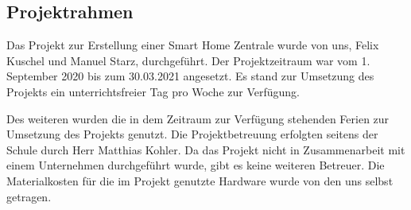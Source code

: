 \subsection{Projektrahmen}
Das Projekt zur Erstellung einer Smart Home Zentrale wurde von uns, Felix Kuschel und Manuel Starz, durchgeführt. Der Projektzeitraum war vom 1. September 2020 bis zum 30.03.2021 angesetzt. Es stand zur Umsetzung des Projekts ein unterrichtsfreier Tag pro Woche zur Verfügung.\par
Des weiteren wurden die in dem Zeitraum zur Verfügung stehenden Ferien zur Umsetzung des Projekts genutzt. Die Projektbetreuung erfolgten seitens der Schule durch Herr Matthias Kohler. Da das Projekt nicht in Zusammenarbeit mit einem Unternehmen durchgeführt wurde, gibt es keine weiteren Betreuer. Die Materialkosten für die im Projekt genutzte Hardware wurde von den uns selbst getragen.